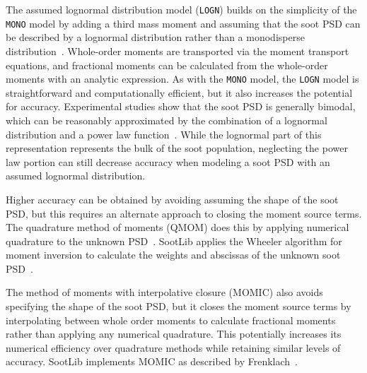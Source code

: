 \documentclass[preprint,letterpaper]{elsarticle}
\begin{document}
The assumed lognormal distribution model (\texttt{LOGN}) builds on the simplicity of the \texttt{MONO} model by adding a third mass moment and assuming that the soot PSD can be described by a lognormal distribution rather than a monodisperse distribution~\cite{Lignell_2008b}. Whole-order moments are transported via the moment transport equations, and fractional moments can be calculated from the whole-order moments with an analytic expression.
As with the \texttt{MONO} model, the \texttt{LOGN} model is straightforward and computationally efficient, but it also increases the potential for accuracy. Experimental studies show that the soot PSD is generally bimodal, which can be reasonably approximated by the combination of a lognormal distribution and a power law function~\cite{Zhao_2003,Zhao_2003b,Wang_2009,Wang_2011,Gu_2016}. While the lognormal part of this representation represents the bulk of the soot population, neglecting the power law portion can still decrease accuracy when modeling a soot PSD with an assumed lognormal distribution.

Higher accuracy can be obtained by avoiding assuming the shape of the soot PSD, but this requires an alternate approach to closing the moment source terms. The quadrature method of moments (QMOM) does this by applying numerical quadrature to the unknown PSD~\cite{McGraw_1997}. SootLib applies the Wheeler algorithm for moment inversion to calculate the weights and abscissas of the unknown soot PSD~\cite{Marchisio_2013,Wheeler_1974}.

The method of moments with interpolative closure (MOMIC) also avoids specifying the shape of the soot PSD, but it closes the moment source terms by interpolating between whole order moments to calculate fractional moments rather than applying any numerical quadrature. This potentially increases its numerical efficiency over quadrature methods while retaining similar levels of accuracy. SootLib implements MOMIC as described by Frenklach~\cite{Frenklach_2002b,Frenklach_1987}.
\end{document}
